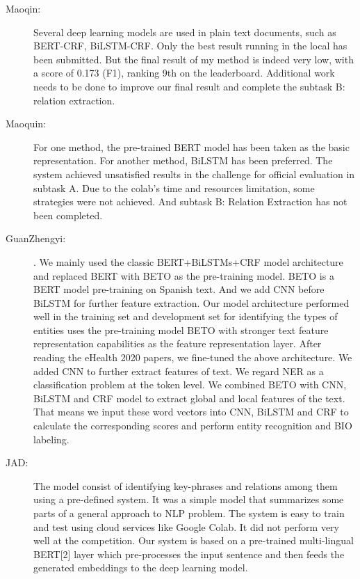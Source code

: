 \documentclass[a4paper,11pt,twocolumn,twoside]{article}
\begin{document}
\begin{description}
  \item[Maoqin:]  Several deep learning models are used in plain text documents, such as
  BERT-CRF, BiLSTM-CRF. Only the best result running in the local has been submitted. But the final
  result of my method is indeed very low, with a score of 0.173 (F1), ranking 9th on the leaderboard.
  Additional work needs to be done to improve our final result and complete the subtask B: relation
  extraction.

  \item[Maoquin:] For one method, the pre-trained BERT model has been taken as the basic representation.
  For another method, BiLSTM has been preferred. The system achieved unsatisfied results in the
  challenge for official evaluation in subtask A. Due to the colab’s time and resources limitation,
  some strategies were not achieved. And subtask B: Relation Extraction has not been completed.
  
  \item [GuanZhengyi:] . We mainly used the classic BERT+BiLSTMs+CRF model architecture and replaced BERT
  with BETO as the pre-training model. BETO is a BERT model pre-training on Spanish text. And we
  add CNN before BiLSTM for further feature extraction. Our model architecture performed well in the
  training set and development set for identifying the types of entities
  uses the pre-training model BETO with stronger text feature
  representation capabilities as the feature representation layer. After reading the eHealth 2020
  papers, we fine-tuned the above architecture. We added CNN to further extract features of
  text. We regard NER as a classification problem at the token level. We combined BETO with
  CNN, BiLSTM and CRF model to extract global and local features of the text. That means we
  input these word vectors into CNN, BiLSTM and CRF to calculate the corresponding scores and
  perform entity recognition and BIO labeling.

  \item[JAD:] The model consist of identifying key-phrases
  and relations among them using a pre-defined system. It was a simple model that summarizes
  some parts of a general approach to NLP problem. The system is easy to train and test using
  cloud services like Google Colab. It did not perform very well at the competition.
  Our system is based on a pre-trained multi-lingual BERT[2] layer which pre-processes the input sentence and then feeds the generated
embeddings to the deep learning model. 
\end{description}
\end{document}
